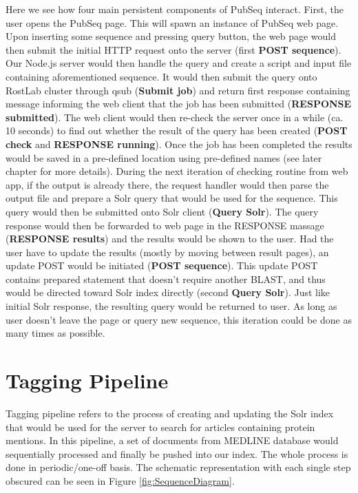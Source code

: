 Here we see how four main persistent components of PubSeq interact. First, the user opens the PubSeq page. This will spawn an instance of PubSeq web page. Upon inserting some sequence and pressing query button, the web page would then submit the initial HTTP request \citep{fielding1999hypertext} onto the server (first \textbf{POST sequence}). Our Node.js server \citep{tilkov2010node} would then handle the query and create a script and input file containing aforementioned sequence. It would then submit the query onto RostLab cluster through qsub (\textbf{Submit job}) \citep{gentzsch2001sun} and return first response containing message informing the web client that the job has been submitted (\textbf{RESPONSE submitted}). The web client would then re-check the server once in a while (ca. 10 seconds) to find out whether the result of the query has been created (\textbf{POST check} and \textbf{RESPONSE running}). Once the job has been completed the results would be saved in a pre-defined location using pre-defined names (see later chapter for more details). During the next iteration of checking routine from web app, if the output is already there, the request handler would then parse the output file and prepare a Solr query that would be used for the sequence. This query would then be submitted onto Solr client (\textbf{Query Solr}). The query response would then be forwarded to web page in the RESPONSE massage (\textbf{RESPONSE results}) and the results would be shown to the user. Had the user have to update the results (mostly by moving between result pages), an update POST would be initiated (\textbf{POST sequence}). This update POST contains prepared statement that doesn't require another BLAST, and thus would be directed toward Solr index directly (second \textbf{Query Solr}). Just like initial Solr response, the resulting query would be returned to user. As long as user doesn't leave the page or query new sequence, this iteration could be done as many times as possible.


\section{Tagging Pipeline}

Tagging pipeline refers to the process of creating and updating the Solr index that would be used for the server to search for articles containing protein mentions. In this pipeline, a set of documents from MEDLINE database would sequentially processed and finally be pushed into our index. The whole process is done in periodic/one-off basis. The schematic representation with each single step obscured can be seen in Figure \ref{fig:SequenceDiagram}.

